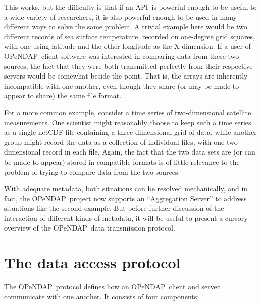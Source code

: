 \documentclass{codata}
\newcommand{\opendap}{\ac{OPeNDAP}}
\newcommand{\api}{\ac{API}}
\begin{document}
This works, but the difficulty is that if an \api\ is powerful enough
to be useful to a wide variety of researchers, it is also powerful
enough to be used in many different ways to solve the same problem.  A
trivial example here would be two different records of sea surface
temperature, recorded on one-degree grid squares, with one using
latitude and the other longitude as the X dimension.  If a user of
\opendap\ client software was interested in comparing data from these
two sources, the fact that they were both transmitted perfectly from
their respective servers would be somewhat beside the point.  That is,
the arrays are inherently incompatible with one another, even though
they share (or may be made to appear to share) the same file format.

For a more common example, consider a time series of two-dimensional
satellite measurements.  One scientist might reasonably choose to keep
such a time series as a single netCDF file containing a
three-dimensional grid of data, while another group might record the
data as a collection of individual files, with one two-dimensional
record in each file.  Again, the fact that the two data sets are (or
can be made to appear) stored in compatible formats is of little
relevance to the problem of trying to compare data from the two
sources.

With adequate metadata, both situations can be resolved mechanically,
and in fact, the \opendap\ project now supports an ``Aggregation
Server'' to address situations like the second example.  But before
further discussion of the interaction of different kinds of metadata,
it will be useful to present a cursory overview of the \opendap\ data
transmission protocol.

\section{The data access protocol}
\label{sec:dap}

The \opendap\ protocol defines how an \opendap\ client and server
communicate with one another.  It consists of four components:
\end{document}
